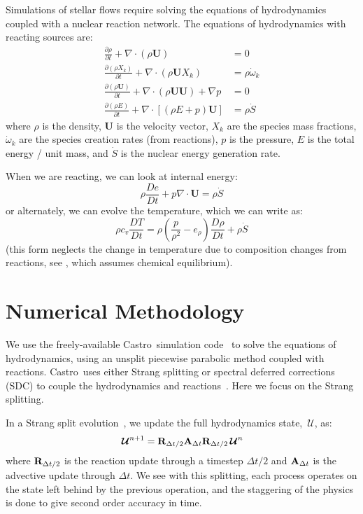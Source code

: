 \documentclass[times,preprint]{aastex63}
\newcommand{\castro}{{\sf Castro}}
\newcommand{\Ub}{\mathbf{U}}
\newcommand{\omegadot}{\dot{\omega}}
\newcommand{\Sdot}{\dot{S}}
\newcommand{\Uc}{{\,\bm{\mathcal{U}}}}
\begin{document}
Simulations of stellar flows require solving the equations of
hydrodynamics coupled with a nuclear reaction network.  The equations
of hydrodynamics with reacting sources are:
\begin{align}
\frac{\partial \rho}{\partial t} + \nabla \cdot (\rho \Ub) &= 0 \\
\frac{\partial (\rho X_k)}{\partial t} + \nabla \cdot (\rho \Ub X_k) &= \rho \omegadot_k \\
\frac{\partial (\rho \Ub)}{\partial t} + \nabla \cdot (\rho \Ub \Ub) + \nabla p &= 0 \\
\frac{\partial (\rho E)}{\partial t} + \nabla \cdot \left [ (\rho E + p) \Ub \right ] &= \rho \Sdot
\end{align}
where $\rho$ is the density, $\Ub$ is the velocity vector, $X_k$ are the species mass fractions,
$\omegadot_k$ are the species creation rates (from reactions), $p$ is the pressure, $E$ is the
total energy / unit mass, and $\Sdot$ is the nuclear energy generation rate.

When we are reacting, we can look at internal energy:
\begin{equation}
\rho \frac{De}{Dt} + p \nabla \cdot \Ub = \rho \Sdot
\end{equation}
or alternately, we can evolve the temperature, which we can write as:
\begin{equation}
\rho c_v \frac{DT}{Dt} = \rho \left (\frac{p}{\rho^2} - e_\rho \right ) \frac{D\rho}{Dt} + \rho \Sdot
\end{equation}
(this form neglects the change in temperature due to composition
changes from reactions, see \citealt{ABNZ:III}, which assumes chemical
equilibrium). 


\section{Numerical Methodology}

We use the freely-available \castro\ simulation
code~\citep{castro,castro_joss} to solve the equations of
hydrodynamics, using an unsplit piecewise parabolic method coupled with
reactions.  \castro\ uses either Strang splitting or
spectral deferred corrections (SDC) to couple the hydrodynamics and
reactions~\citep{castro_sdc}.  Here we focus on the Strang splitting.

In a Strang split evolution~\citep{strang:1968}, we update the full
hydrodynamics state, $\Uc$, as:
\begin{equation}
  \Uc^{n+1} = {\bf R}_{\Delta t/2} {\bf A}_{\Delta t} {\bf R}_{\Delta t/2} \Uc^n
\end{equation}
where ${\bf R}_{\Delta t/2}$ is the reaction update through a timestep
$\Delta t/2$ and ${\bf A}_{\Delta t}$ is the advective update through
$\Delta t$.  We see with this splitting, each process operates on the
state left behind by the previous operation, and the staggering of the
physics is done to give second order accuracy in time.
\end{document}
